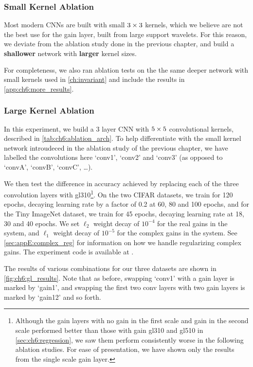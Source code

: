 \subsubsection{Small Kernel Ablation}
Most modern CNNs are built with small $3\times 3$ kernels, which we believe are not the best
use for the gain layer, built from large support wavelets. For this reason, we
deviate from the ablation study done in the previous chapter, and build a
\textbf{shallower} network with \textbf{larger} kernel sizes. 

For completeness, we also ran ablation tests on the the same deeper network
with small kernels used in \autoref{ch:invariant} and include the results in 
\autoref{app:ch6:more_results}.

\subsubsection{Large Kernel Ablation}


\renewcommand{\_}{\textscale{.6}{\textunderscore}}
In this experiment, we build a 3 layer
CNN with $5\times 5$ convolutional kernels, described in \autoref{tab:ch6:ablation_arch}.
To help differentiate with the small kernel network introudeced in the 
ablation study of the previous chapter, we have labelled the convolutions here
`conv1', `conv2' and `conv3' (as opposed to `convA', `convB', `convC',
\ldots).

We then test the difference in accuracy achieved by replacing each of the three
convolution layers with gl310\footnote{Although the gain layers with no gain in
the first scale and gain in the second scale performed better than those with
gain gl310 and gl510 in \autoref{sec:ch6:regression}, we saw them perform
consistently worse in the following ablation studies. For ease of presentation,
we have shown only the results from the single scale gain layer.}. 
On the two CIFAR datasets, we train for 120 epochs, decaying learning rate by a
factor of 0.2 at 60, 80 and 100 epochs, and for the Tiny ImageNet dataset, we
train for 45 epochs, decaying learning rate at 18, 30 and 40 epochs. We set 
$\ell_2$ weight decay of $10^{-4}$ for the real gains in the system, and
$\ell_1$ weight decay of $10^{-5}$ for the complex gains in the system. See
\autoref{sec:appE:complex_reg} for information on how we handle regularizing complex
gains. The
experiment code is available at \cite{cotter_dtcwt_2018}.

The results of various combinations for our three datasets are shown in
\autoref{fig:ch6:gl_results}.
Note that as before, swapping `conv1' with a gain layer is marked by `gain1',
and swapping the first two conv layers with two gain layers is marked by
`gain1\_2' and so forth.  

